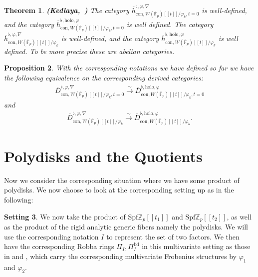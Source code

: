 \documentclass[11pt]{book}
\newtheorem{theorem}{Theorem}[section]
\newtheorem{proposition}[theorem]{Proposition}
\theoremstyle{definition}
\numberwithin{equation}{section}
\newtheorem{setting}[theorem]{Setting}
\begin{document}
\begin{theorem}\mbox{\bf{(Kedlaya, \cite[Corollary 4.7]{Ked9})}}
The category $\overline{h}^{\flat,\varphi,\nabla}_{\mathrm{con},W(\overline{\mathbb{F}}_p)[[t]]/\varphi_k,t=0}$ is well-defined, and the category $\overline{h}^{\flat,\mathrm{holo},\varphi}_{\mathrm{con},W(\overline{\mathbb{F}}_p)[[t]]/\varphi_k,t=0}$ is well defined. The category $\overline{h}^{\flat,\varphi,\nabla}_{\mathrm{con},W(\overline{\mathbb{F}}_p)[[t]]/\varphi_k}$ is well-defined, and the category $\overline{h}^{\flat,\mathrm{holo},\varphi}_{\mathrm{con},W(\overline{\mathbb{F}}_p)[[t]]/\varphi_k}$ is well defined. To be more precise these are abelian categories.
	
\end{theorem}




\begin{proposition} \label{proposition4.15}
With the corresponding notations we have defined so far we have the following equivalence on the corresponding derived categories:
\begin{align}
\overline{D}^{\flat,\varphi,\nabla}_{\mathrm{con},W(\overline{\mathbb{F}}_p)[[t]]/\varphi_k,t=0}\overset{\sim}{\longrightarrow} \overline{D}^{\flat,\mathrm{holo},\varphi}_{\mathrm{con},W(\overline{\mathbb{F}}_p)[[t]]/\varphi_k,t=0}	
\end{align}
and 
\begin{align}
\overline{D}^{\flat,\varphi,\nabla}_{\mathrm{con},W(\overline{\mathbb{F}}_p)[[t]]/\varphi_k}\overset{\sim}{\longrightarrow} \overline{D}^{\flat,\mathrm{holo},\varphi}_{\mathrm{con},W(\overline{\mathbb{F}}_p)[[t]]/\varphi_k}.	
\end{align}
	
\end{proposition}







\newpage
\section{Polydisks and the Quotients}



\indent Now we consider the corresponding situation where we have some product of polydisks. We now choose to look at the corresponding setting up as in the following:

\begin{setting}
We now take the product of $\mathrm{Spf}\mathbb{Z}_p[[t_1]]$ and $\mathrm{Spf}\mathbb{Z}_p[[t_2]]$, as well as the product of the rigid analytic generic fibers namely the polydisks. We will use the corresponding notation $I$ to represent the set of two factors. We then have the corresponding Robba rings $\Pi_I,\Pi_I^\mathrm{bd}$ in this multivariate setting as those in \cite{PZ} and \cite{CKZ}, which carry the corresponding multivariate Frobenius structures by $\varphi_1$ and $\varphi_2$.   	
\end{setting}
\end{document}
